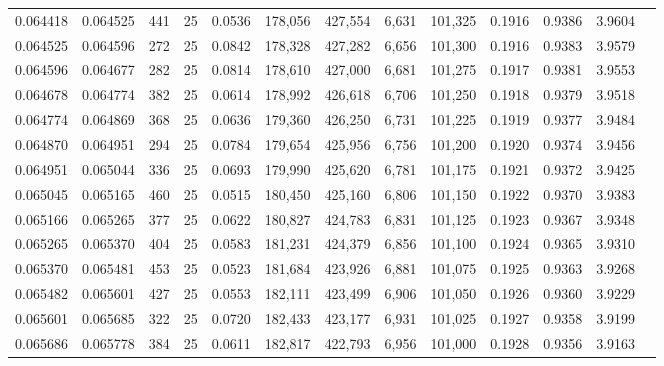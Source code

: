 \begin{tabular}{rrrrrrrrrrrrr}
0.064418 & 0.064525 &   441 &  25 &                                     0.0536 & 178,056 & 427,554 &   6,631 & 101,325 & 0.1916 & 0.9386 & 3.9604 \\
0.064525 & 0.064596 &   272 &  25 &                                     0.0842 & 178,328 & 427,282 &   6,656 & 101,300 & 0.1916 & 0.9383 & 3.9579 \\
0.064596 & 0.064677 &   282 &  25 &                                     0.0814 & 178,610 & 427,000 &   6,681 & 101,275 & 0.1917 & 0.9381 & 3.9553 \\
0.064678 & 0.064774 &   382 &  25 &                                     0.0614 & 178,992 & 426,618 &   6,706 & 101,250 & 0.1918 & 0.9379 & 3.9518 \\
0.064774 & 0.064869 &   368 &  25 &                                     0.0636 & 179,360 & 426,250 &   6,731 & 101,225 & 0.1919 & 0.9377 & 3.9484 \\
0.064870 & 0.064951 &   294 &  25 &                                     0.0784 & 179,654 & 425,956 &   6,756 & 101,200 & 0.1920 & 0.9374 & 3.9456 \\
0.064951 & 0.065044 &   336 &  25 &                                     0.0693 & 179,990 & 425,620 &   6,781 & 101,175 & 0.1921 & 0.9372 & 3.9425 \\
0.065045 & 0.065165 &   460 &  25 &                                     0.0515 & 180,450 & 425,160 &   6,806 & 101,150 & 0.1922 & 0.9370 & 3.9383 \\
0.065166 & 0.065265 &   377 &  25 &                                     0.0622 & 180,827 & 424,783 &   6,831 & 101,125 & 0.1923 & 0.9367 & 3.9348 \\
0.065265 & 0.065370 &   404 &  25 &                                     0.0583 & 181,231 & 424,379 &   6,856 & 101,100 & 0.1924 & 0.9365 & 3.9310 \\
0.065370 & 0.065481 &   453 &  25 &                                     0.0523 & 181,684 & 423,926 &   6,881 & 101,075 & 0.1925 & 0.9363 & 3.9268 \\
0.065482 & 0.065601 &   427 &  25 &                                     0.0553 & 182,111 & 423,499 &   6,906 & 101,050 & 0.1926 & 0.9360 & 3.9229 \\
0.065601 & 0.065685 &   322 &  25 &                                     0.0720 & 182,433 & 423,177 &   6,931 & 101,025 & 0.1927 & 0.9358 & 3.9199 \\
0.065686 & 0.065778 &   384 &  25 &                                     0.0611 & 182,817 & 422,793 &   6,956 & 101,000 & 0.1928 & 0.9356 & 3.9163 \\

\end{tabular}

